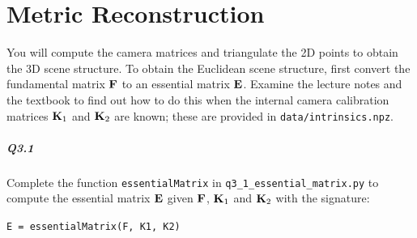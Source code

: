 \section{Metric Reconstruction}
\label{sec:essmatrix}

You will compute the camera matrices and triangulate the 2D points to obtain the 3D scene structure. To obtain the Euclidean scene structure, first convert the fundamental matrix ${\bf F}$ to an essential matrix ${\bf E}$. Examine the lecture notes and the textbook to find out how to do this when the internal camera calibration matrices ${\bf K}_1$ and ${\bf K}_2$ are known; these are provided in \texttt{data/intrinsics.npz}.

\subparagraph*{Q3.1}
Complete the function \texttt{essentialMatrix} in \texttt{q3\_1\_essential\_matrix.py} to compute the essential matrix ${\bf E}$ given ${\bf F}$, ${\bf K}_1$ and ${\bf K}_2$ with the signature:
\begin{center}
    \texttt{E = essentialMatrix(F, K1, K2)}
\end{center}


